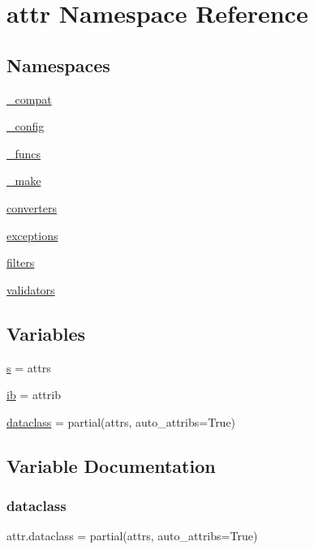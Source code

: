 \hypertarget{namespaceattr}{}\section{attr Namespace Reference}
\label{namespaceattr}
\subsection*{Namespaces}
\begin{DoxyCompactItemize}
\item 
 \hyperlink{namespaceattr_1_1__compat}{\+\_\+compat}
\item 
 \hyperlink{namespaceattr_1_1__config}{\+\_\+config}
\item 
 \hyperlink{namespaceattr_1_1__funcs}{\+\_\+funcs}
\item 
 \hyperlink{namespaceattr_1_1__make}{\+\_\+make}
\item 
 \hyperlink{namespaceattr_1_1converters}{converters}
\item 
 \hyperlink{namespaceattr_1_1exceptions}{exceptions}
\item 
 \hyperlink{namespaceattr_1_1filters}{filters}
\item 
 \hyperlink{namespaceattr_1_1validators}{validators}
\end{DoxyCompactItemize}
\subsection*{Variables}
\begin{DoxyCompactItemize}
\item 
\hyperlink{namespaceattr_ab7304213fe02a4828528ee572122c00b}{s} = attrs
\item 
\hyperlink{namespaceattr_a2799a60f81b3e70456d382bab67d82d0}{ib} = attrib
\item 
\hyperlink{namespaceattr_ac2a48a78aea96a8bc589d42ae2117944}{dataclass} = partial(attrs, auto\+\_\+attribs=True)
\end{DoxyCompactItemize}


\subsection{Variable Documentation}
\mbox{\label{namespaceattr_ac2a48a78aea96a8bc589d42ae2117944}} 
\subsubsection{\texorpdfstring{dataclass}{dataclass}}
{\footnotesize\ttfamily attr.\+dataclass = partial(attrs, auto\+\_\+attribs=True)}

